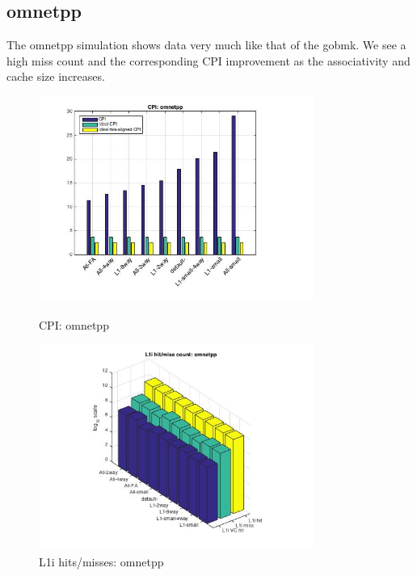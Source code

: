 \documentclass[11pt,titlepage]{article}
\begin{document}
    \subsection{omnetpp}
    The omnetpp simulation shows data very much like that of the gobmk. We see a high miss count and the corresponding CPI improvement as the associativity and cache size increases.
    \begin{figure}[H]
      \centering
      \begin{minipage}{.45\textwidth}
      \includegraphics[width=9cm]{CPIomnetpp}
      \caption{CPI: omnetpp}
      \label{fig:CPIomnetpp}
      \end{minipage}
      \begin{minipage}{.45\textwidth}
            \centering
            \includegraphics[width=9cm]{L1IHM_omnetpp}
            \caption{L1i hits/misses: omnetpp}
            \label{fig:L1IHM_omnetpp}
          \end{minipage}%
           \end{figure}
\end{document}
